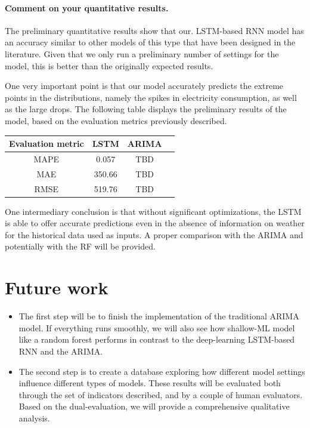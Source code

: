 \documentclass[10pt,twocolumn,letterpaper]{article}
\begin{document}
\paragraph{Comment on your quantitative results.} The preliminary quantitative results show that our. LSTM-based RNN model has an accuracy similar to other models of this type that have been designed in the literature. Given that we only run a preliminary number of settings for the model, this is better than the originally expected results. 

One very important point is that our model accurately predicts the extreme points in the distributions, namely the spikes in electricity consumption, as well as the large drops. The following table displays the preliminary results of the model, based on the evaluation metrics previously described. 

\begin{center}
 \begin{tabular}{||c c c c||} 
 \hline
Evaluation metric & LSTM & ARIMA &\\ [0.5ex] 
 \hline\hline
 MAPE & 0.057 & TBD&\\ 
 \hline
 MAE & 350.66 & TBD &\\
 \hline
 RMSE & 519.76 & TBD & \\
 \hline
\end{tabular}
\end{center}

One intermediary conclusion is that without significant optimizations, the LSTM is able to offer accurate predictions even in the absence of information on weather for the historical data used as inputs. A proper comparison with the ARIMA and potentially with the RF will be provided.
\section{Future work}

\begin{itemize}
\item The first step will be to finish the implementation of the traditional ARIMA model. If everything runs smoothly, we will also see how shallow-ML model like a random forest performs in contrast to the deep-learning LSTM-based RNN and the ARIMA.
\item The second step is to create a database exploring how different model settings influence different types of models. These results will be evaluated both through the set of indicators described, and by a couple of human evaluators. Based on the dual-evaluation, we will provide a comprehensive qualitative analysis. 
\end{itemize}
\end{document}
